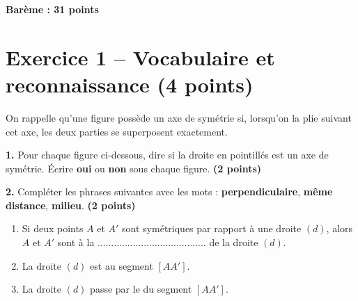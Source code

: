 \documentclass[11pt,a4paper]{article}
\newcommand{\points}[1]{\hfill \textbf{(#1 points)}}
\begin{document}
\vspace{0.3cm}

\begin{center}
\textbf{Barème : 31 points}
\end{center}

\section*{Exercice 1 -- Vocabulaire et reconnaissance \points{4}}

On rappelle qu'une figure possède un axe de symétrie si, lorsqu'on la plie suivant cet axe, les deux parties se superposent exactement.

\medskip

\textbf{1.} Pour chaque figure ci-dessous, dire si la droite en pointillés est un axe de symétrie.  
Écrire \textbf{oui} ou \textbf{non} sous chaque figure. \points{2}

\begin{center}
\end{center}

\vspace{0.4cm}

\textbf{2.} Compléter les phrases suivantes avec les mots :  
\textbf{perpendiculaire}, \textbf{même distance}, \textbf{milieu}. \points{2}

\begin{enumerate}[label=\alph*)]
    \item Si deux points $A$ et $A'$ sont symétriques par rapport à une droite $(d)$, alors $A$ et $A'$ sont à la ........................................ de la droite $(d)$.
    \item La droite $(d)$ est \dotfill au segment $[AA']$.
    \item La droite $(d)$ passe par le \dotfill du segment $[AA']$.
\end{enumerate}
\end{document}
